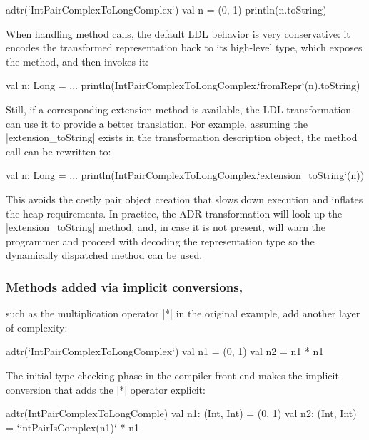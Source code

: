 \begin{lstlisting-nobreak}
adtr(`IntPairComplexToLongComplex`) {
  val n = (0, 1)
  println(n.toString)
}
\end{lstlisting-nobreak}

When handling method calls, the default LDL behavior is very conservative: it encodes the transformed representation back to its high-level type, which exposes the method, and then invokes it:

\begin{lstlisting-nobreak}
val n: Long = ...
println(IntPairComplexToLongComplex.`fromRepr`(n).toString)
\end{lstlisting-nobreak}

Still, if a corresponding extension method is available, the LDL transformation can use it to provide a better translation. For example, assuming the |extension_toString| exists in the transformation description object, the method call can be rewritten to:

\begin{lstlisting-nobreak}
val n: Long = ...
println(IntPairComplexToLongComplex.`extension_toString`(n))
\end{lstlisting-nobreak}

This avoids the costly pair object creation that slows down execution and inflates the heap requirements. In practice, the ADR transformation will look up the |extension_toString| method, and, in case it is not present, will warn the programmer and proceed with decoding the representation type so the dynamically dispatched method can be used.

\subsubsection{Methods added via implicit conversions,} such as the multiplication operator |*| in the original example, add another layer of complexity:

\begin{lstlisting-nobreak}
adtr(`IntPairComplexToLongComplex`) {
  val n1 = (0, 1)
  val n2 = n1 * n1
}
\end{lstlisting-nobreak}

The initial type-checking phase in the compiler front-end makes the implicit conversion that adds the |*| operator explicit:

\begin{lstlisting-nobreak}
adtr(IntPairComplexToLongComple) {
  val n1: (Int, Int) = (0, 1)
  val n2: (Int, Int) = `intPairIsComplex(n1)` * n1
}
\end{lstlisting-nobreak}

